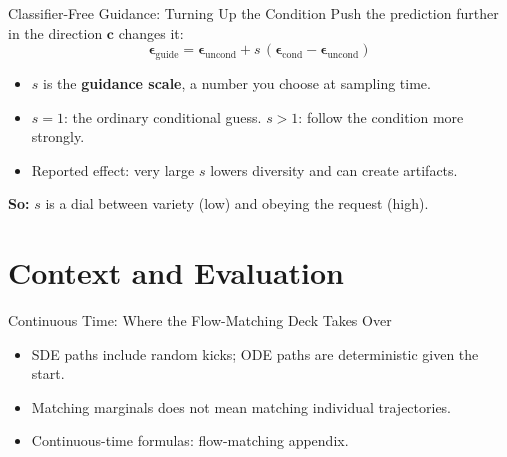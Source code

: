 \documentclass{ntuabeamer}
\begin{document}
\begin{frame}{Classifier-Free Guidance: Turning Up the Condition}
  Push the prediction further in the direction \(\mathbf c\) changes it:
  \[
    \boxed{\boldsymbol\epsilon_{\mathrm{guide}}
      =\boldsymbol\epsilon_{\mathrm{uncond}}
       +s\,(\boldsymbol\epsilon_{\mathrm{cond}}-\boldsymbol\epsilon_{\mathrm{uncond}})}
  \]
  \begin{itemize}
    \item \(s\) is the \textbf{guidance scale}, a number you choose at sampling time.
    \item \(s=1\): the ordinary conditional guess. \(s>1\): follow the condition more strongly.
    \item Reported effect: very large \(s\) lowers diversity and can create artifacts.
  \end{itemize}
  \textbf{So:} \(s\) is a dial between variety (low) and obeying the request (high).
\end{frame}

\section{Context and Evaluation}

\begin{frame}{Continuous Time: Where the Flow-Matching Deck Takes Over}
  \begin{center}
  \end{center}
  \begin{itemize}
    \item SDE paths include random kicks; ODE paths are deterministic given the start.
    \item Matching marginals does not mean matching individual trajectories.
    \item Continuous-time formulas: flow-matching appendix.
  \end{itemize}
\end{frame}
\end{document}
